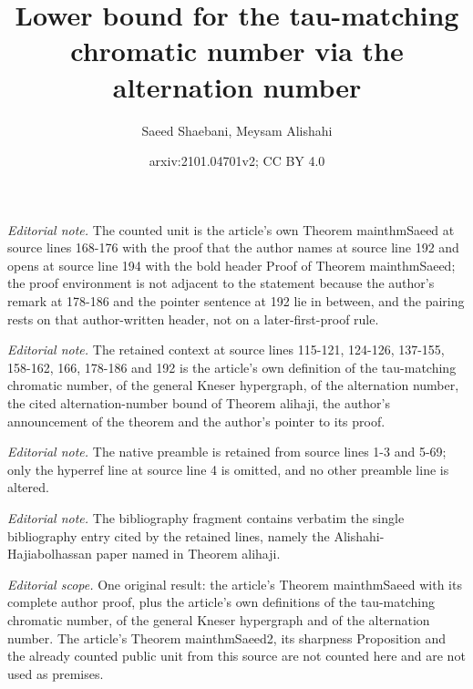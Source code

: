 \documentclass[11pt]{amsart}
\title{Lower bound for the tau-matching chromatic number via the alternation number}
\author{Saeed Shaebani, Meysam Alishahi}
\date{arxiv:2101.04701v2; CC BY 4.0}
\theoremstyle{definition}
\begin{document}
\maketitle
\noindent\textit{Editorial note.} The counted unit is the article's own Theorem mainthmSaeed at source lines 168-176 with the proof that the author names at source line 192 and opens at source line 194 with the bold header Proof of Theorem mainthmSaeed; the proof environment is not adjacent to the statement because the author's remark at 178-186 and the pointer sentence at 192 lie in between, and the pairing rests on that author-written header, not on a later-first-proof rule.\par\medskip
\noindent\textit{Editorial note.} The retained context at source lines 115-121, 124-126, 137-155, 158-162, 166, 178-186 and 192 is the article's own definition of the tau-matching chromatic number, of the general Kneser hypergraph, of the alternation number, the cited alternation-number bound of Theorem alihaji, the author's announcement of the theorem and the author's pointer to its proof.\par\medskip
\noindent\textit{Editorial note.} The native preamble is retained from source lines 1-3 and 5-69; only the hyperref line at source line 4 is omitted, and no other preamble line is altered.\par\medskip
\noindent\textit{Editorial note.} The bibliography fragment contains verbatim the single bibliography entry cited by the retained lines, namely the Alishahi-Hajiabolhassan paper named in Theorem alihaji.\par\medskip
\noindent\textit{Editorial scope.} One original result: the article's Theorem mainthmSaeed with its complete author proof, plus the article's own definitions of the tau-matching chromatic number, of the general Kneser hypergraph and of the alternation number. The article's Theorem mainthmSaeed2, its sharpness Proposition and the already counted public unit from this source are not counted here and are not used as premises.\par\medskip
\end{document}
